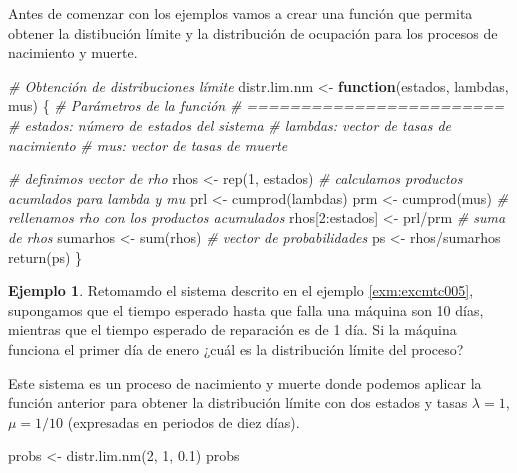 \documentclass[
]{book}
\newenvironment{Shaded}{\begin{snugshade}}{\end{snugshade}}
\newcommand{\CommentTok}[1]{\textcolor[rgb]{0.56,0.35,0.01}{\textit{#1}}}
\newcommand{\ControlFlowTok}[1]{\textcolor[rgb]{0.13,0.29,0.53}{\textbf{#1}}}
\newcommand{\DecValTok}[1]{\textcolor[rgb]{0.00,0.00,0.81}{#1}}
\newcommand{\FloatTok}[1]{\textcolor[rgb]{0.00,0.00,0.81}{#1}}
\newcommand{\FunctionTok}[1]{\textcolor[rgb]{0.00,0.00,0.00}{#1}}
\newcommand{\NormalTok}[1]{#1}
\newcommand{\OtherTok}[1]{\textcolor[rgb]{0.56,0.35,0.01}{#1}}
\newcommand{\SpecialCharTok}[1]{\textcolor[rgb]{0.00,0.00,0.00}{#1}}
\theoremstyle{definition}
\theoremstyle{definition}
\newtheorem{example}{Ejemplo}[chapter]
\theoremstyle{definition}
\theoremstyle{definition}
\theoremstyle{remark}
\begin{document}
Antes de comenzar con los ejemplos vamos a crear una función que permita obtener la distibución límite y la distribución de ocupación para los procesos de nacimiento y muerte.

\begin{Shaded}
\begin{Highlighting}[]
\CommentTok{\# Obtención de distribuciones límite }
\NormalTok{distr.lim.nm }\OtherTok{\textless{}{-}} \ControlFlowTok{function}\NormalTok{(estados, lambdas, mus)}
\NormalTok{\{}
  \CommentTok{\# Parámetros de la función}
  \CommentTok{\# ========================}
  \CommentTok{\# estados: número de estados del sistema}
  \CommentTok{\# lambdas: vector de tasas de nacimiento}
  \CommentTok{\# mus: vector de tasas de muerte}
  
  \CommentTok{\# definimos vector de rho}
\NormalTok{  rhos }\OtherTok{\textless{}{-}} \FunctionTok{rep}\NormalTok{(}\DecValTok{1}\NormalTok{, estados)}
  \CommentTok{\# calculamos productos acumlados para lambda y mu}
\NormalTok{  prl }\OtherTok{\textless{}{-}} \FunctionTok{cumprod}\NormalTok{(lambdas)}
\NormalTok{  prm }\OtherTok{\textless{}{-}} \FunctionTok{cumprod}\NormalTok{(mus)}
  \CommentTok{\# rellenamos rho con los productos acumulados}
\NormalTok{  rhos[}\DecValTok{2}\SpecialCharTok{:}\NormalTok{estados] }\OtherTok{\textless{}{-}}\NormalTok{ prl}\SpecialCharTok{/}\NormalTok{prm}
  \CommentTok{\# suma de rhos}
\NormalTok{  sumarhos }\OtherTok{\textless{}{-}} \FunctionTok{sum}\NormalTok{(rhos)}
  \CommentTok{\# vector de probabilidades}
\NormalTok{  ps }\OtherTok{\textless{}{-}}\NormalTok{ rhos}\SpecialCharTok{/}\NormalTok{sumarhos}
  \FunctionTok{return}\NormalTok{(ps)}
\NormalTok{\}}
\end{Highlighting}
\end{Shaded}

\begin{example}
Retomamdo el sistema descrito en el ejemplo \ref{exm:excmtc005}, supongamos que el tiempo esperado hasta que falla una máquina son 10 días, mientras que el tiempo esperado de reparación es de 1 día. Si la máquina funciona el primer día de enero ¿cuál es la distribución límite del proceso?

Este sistema es un proceso de nacimiento y muerte donde podemos aplicar la función anterior para obtener la distribución límite con dos estados y tasas \(\lambda = 1\), \(\mu = 1/10\) (expresadas en periodos de diez días).
\end{example}

\begin{Shaded}
\begin{Highlighting}[]
\NormalTok{probs }\OtherTok{\textless{}{-}} \FunctionTok{distr.lim.nm}\NormalTok{(}\DecValTok{2}\NormalTok{, }\DecValTok{1}\NormalTok{, }\FloatTok{0.1}\NormalTok{)}
\NormalTok{probs}
\end{Highlighting}
\end{Shaded}
\end{document}
